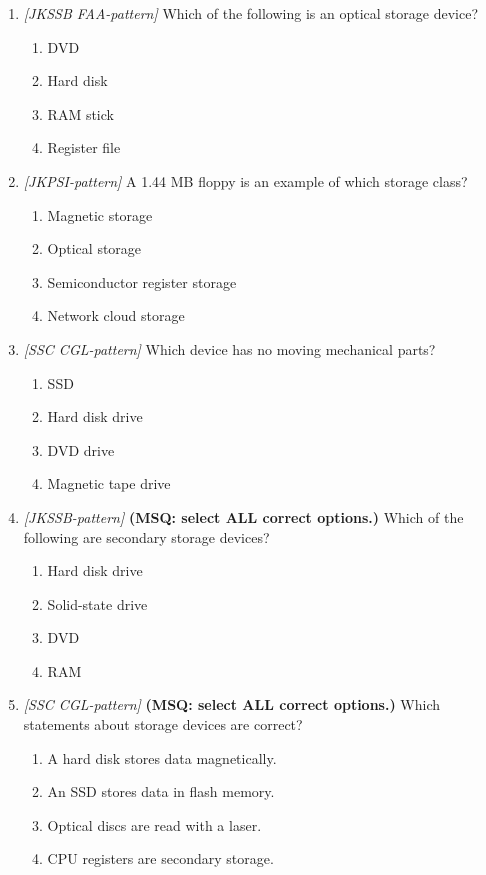 \documentclass[11pt]{article}
\begin{document}
\begin{enumerate}[label=\textbf{Q\arabic*.}, leftmargin=*]
\item \textit{[JKSSB FAA-pattern]} Which of the following is an optical storage device?
  \begin{enumerate}[label=\Alph*.]
    \item DVD
    \item Hard disk
    \item RAM stick
    \item Register file
  \end{enumerate}
\item \textit{[JKPSI-pattern]} A 1.44 MB floppy is an example of which storage class?
  \begin{enumerate}[label=\Alph*.]
    \item Magnetic storage
    \item Optical storage
    \item Semiconductor register storage
    \item Network cloud storage
  \end{enumerate}
\item \textit{[SSC CGL-pattern]} Which device has no moving mechanical parts?
  \begin{enumerate}[label=\Alph*.]
    \item SSD
    \item Hard disk drive
    \item DVD drive
    \item Magnetic tape drive
  \end{enumerate}
\item \textit{[JKSSB-pattern]} \textbf{(MSQ: select ALL correct options.)} Which of the following are secondary storage devices?
  \begin{enumerate}[label=\Alph*.]
    \item Hard disk drive
    \item Solid-state drive
    \item DVD
    \item RAM
  \end{enumerate}
\item \textit{[SSC CGL-pattern]} \textbf{(MSQ: select ALL correct options.)} Which statements about storage devices are correct?
  \begin{enumerate}[label=\Alph*.]
    \item A hard disk stores data magnetically.
    \item An SSD stores data in flash memory.
    \item Optical discs are read with a laser.
    \item CPU registers are secondary storage.
  \end{enumerate}
\end{enumerate}
\def\JKSSBLessonID{10}\def\JKSSBAnswers{0}
\end{document}
